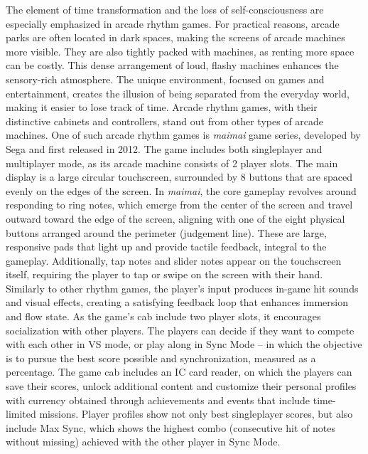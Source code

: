 The element of time transformation and the loss of self-consciousness are especially emphasized in arcade rhythm games. For practical reasons, arcade parks are often located in dark spaces, making the screens of arcade machines more visible. They are also tightly packed with machines, as renting more space can be costly. This dense arrangement of loud, flashy machines enhances the sensory-rich atmosphere. The unique environment, focused on games and entertainment, creates the illusion of being separated from the everyday world, making it easier to lose track of time. Arcade rhythm games, with their distinctive cabinets and controllers, stand out from other types of arcade machines. One of such arcade rhythm games is \textit{maimai} game series, developed by Sega and first released in 2012. The game includes both singleplayer and multiplayer mode, as its arcade machine consists of 2 player slots. The main display is a large circular touchscreen, surrounded by 8 buttons that are spaced evenly on the edges of the screen. In \textit{maimai}, the core gameplay revolves around responding to ring notes, which emerge from the center of the screen and travel outward toward the edge of the screen, aligning with one of the eight physical buttons arranged around the perimeter (judgement line). These are large, responsive pads that light up and provide tactile feedback, integral to the gameplay. Additionally, tap notes and slider notes appear on the touchscreen itself, requiring the player to tap or swipe on the screen with their hand. 
Similarly to other rhythm games, the player’s input produces in-game hit sounds and visual effects, creating a satisfying feedback loop that enhances immersion and flow state. As the game’s cab include two player slots, it encourages socialization with other players. The players can decide if they want to compete with each other in VS mode, or play along in Sync Mode -- in which the objective is to pursue the best score possible and synchronization, measured as a percentage. The game cab includes an IC card reader, on which the players can save their scores, unlock additional content and customize their personal profiles with currency obtained through achievements and events that include time-limited missions. Player profiles show not only best singleplayer scores, but also include Max Sync, which shows the highest combo (consecutive hit of notes without missing) achieved with the other player in Sync Mode.

